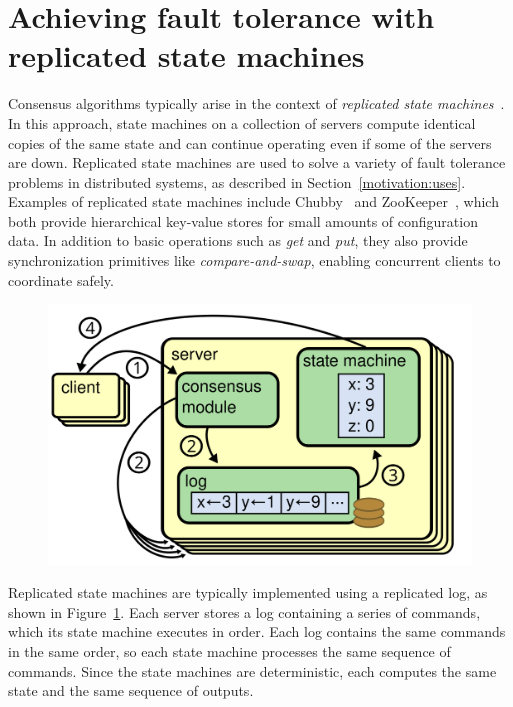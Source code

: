 \section{Achieving fault tolerance with replicated state machines}
\label{motivation:problem}

Consensus algorithms typically arise in the context of
\emph{replicated state machines}~\cite{Schneider:1990}. In this approach, state
machines on a collection of servers compute identical copies of
the same state and can continue operating even if some of the
servers are down.
Replicated state machines are used to solve a variety of
fault tolerance problems in
distributed systems, as described in
Section~\ref{motivation:uses}.
Examples of replicated state machines include Chubby~\cite{Burrows:2006}
and ZooKeeper~\cite{Hunt:2010},
which both provide hierarchical key-value stores for small
amounts of configuration data. In addition to basic operations such as
\emph{get} and \emph{put}, they also provide synchronization primitives
like \emph{compare-and-swap}, enabling concurrent clients to coordinate
safely.

\begin{figure}
\centering
\includegraphics[scale=.50]{motivation/statemachine}
\label{fig:motivation:statemachine}
\end{figure}

Replicated state machines are typically implemented using a replicated
log, as shown in Figure~\ref{fig:motivation:statemachine}. Each server stores a log
containing a series of commands, which its state machine executes in order.
Each log contains the same commands in the same order, so each state
machine processes the same sequence of commands. Since the state
machines are deterministic, each computes the same state and the same
sequence of outputs.

